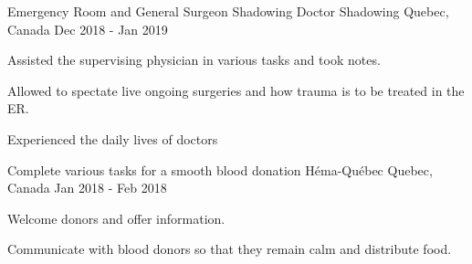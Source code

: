 
\begin{cventries}
\cventry
    {Emergency Room and General Surgeon Shadowing}
    {Doctor Shadowing}
    {Quebec, Canada}
    {Dec 2018 - Jan 2019}
    {
      \begin{cvitems}
        \item {Assisted the supervising physician in various tasks and took notes.}
        \item {Allowed to spectate live ongoing surgeries and how trauma is to be treated in the ER.}
        \item {Experienced the daily lives of doctors}
      \end{cvitems}
    }    \newline

\cventry
    {Complete various tasks for a smooth blood donation}
    {Héma-Québec}
    {Quebec, Canada}
    {Jan 2018 - Feb 2018}
    {
      \begin{cvitems}
        \item {Welcome donors and offer information.}
        \item {Communicate with blood donors so that they remain calm and distribute food.}
      \end{cvitems}
    }    \newline


    \end{cventries}
